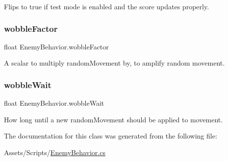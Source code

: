 Flips to true if test mode is enabled and the score updates properly. 

\mbox{\label{class_enemy_behavior_a80484f747dfb85a8063a50dd115f65e0}} 
\subsubsection{\texorpdfstring{wobbleFactor}{wobbleFactor}}
{\footnotesize\ttfamily float Enemy\+Behavior.\+wobble\+Factor}



A scalar to multiply random\+Movement by, to amplify random movement. 

\mbox{\label{class_enemy_behavior_ade5bcff77085ea22523d28312c252d75}} 
\subsubsection{\texorpdfstring{wobbleWait}{wobbleWait}}
{\footnotesize\ttfamily float Enemy\+Behavior.\+wobble\+Wait}



How long until a new random\+Movement should be applied to movement. 



The documentation for this class was generated from the following file\+:\begin{DoxyCompactItemize}
\item 
Assets/\+Scripts/\mbox{\hyperlink{_enemy_behavior_8cs}{Enemy\+Behavior.\+cs}}\end{DoxyCompactItemize}

